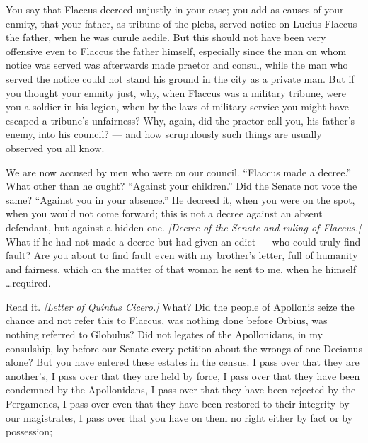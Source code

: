  You say that Flaccus decreed unjustly in your case; you add as causes of your enmity, that your father, as tribune of the plebs, served notice on Lucius Flaccus the father, when he was curule aedile. But this should not have been very offensive even to Flaccus the father himself, especially since the man on whom notice was served was afterwards made praetor and consul, while the man who served the notice could not stand his ground in the city as a private man. But if you thought your enmity just, why, when Flaccus was a military tribune, were you a soldier in his legion, when by the laws of military service you might have escaped a tribune's unfairness? Why, again, did the praetor call you, his father's enemy, into his council? --- and how scrupulously such things are usually observed you all know.

 We are now accused by men who were on our council. ``Flaccus made a decree.'' What other than he ought? ``Against your children.'' Did the Senate not vote the same? ``Against you in your absence.'' He decreed it, when you were on the spot, when you would not come forward; this is not a decree against an absent defendant, but against a hidden one. \textit{[Decree of the Senate and ruling of Flaccus.]} What if he had not made a decree but had given an edict --- who could truly find fault? Are you about to find fault even with my brother's letter, full of humanity and fairness, which on the matter of that woman he sent to me, when he himself \ldots required.

 Read it. \textit{[Letter of Quintus Cicero.]} What? Did the people of Apollonis seize the chance and not refer this to Flaccus, was nothing done before Orbius, was nothing referred to Globulus? Did not legates of the Apollonidans, in my consulship, lay before our Senate every petition about the wrongs of one Decianus alone? But you have entered these estates in the census. I pass over that they are another's, I pass over that they are held by force, I pass over that they have been condemned by the Apollonidans, I pass over that they have been rejected by the Pergamenes, I pass over even that they have been restored to their integrity by our magistrates, I pass over that you have on them no right either by fact or by possession;

